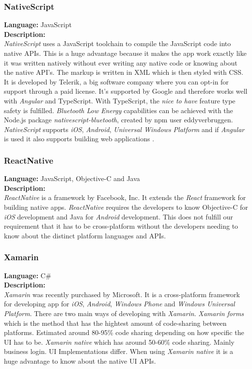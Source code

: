 \subsubsection{NativeScript}
\textbf{Language:} JavaScript
\\
\textbf{Description:}
\\
\textit{NativeScript} uses a JavaScript toolchain to compile the JavaScript code into native APIs. This is a huge advantage because it makes the app work exactly like it was written natively without ever writing any native code or knowing about the native API’s. The markup is written in XML which is then styled with CSS.
It is developed by Telerik, a big software company where you can opt-in for support through a paid license. It’s supported by Google and therefore works well with \textit{Angular} and TypeScript. With TypeScript, the \textit{nice to have} feature type safety is fulfilled. \textit{Bluetooth Low Energy} capabilities can be achieved with the Node.js package \textit{nativescript-bluetooth}, created by npm user eddyverbruggen. \textit{NativeScript} supports \textit{iOS}, \textit{Android}, \textit{Universal Windows Platform} and if \textit{Angular} is used it also supports building web applications \citep{preStudy:frameworks:nativescript}.


\subsubsection{ReactNative}
\textbf{Language:} JavaScript, Objective-C and Java
\\
\textbf{Description:}
\\
\textit{ReactNative} is a framework by Facebook, Inc. It extends the \textit{React} framework for building native apps. \textit{ReactNative} requires the developers to know Objective-C for \textit{iOS} development and Java for \textit{Android} development. This does not fulfill our requirement that it has to be cross-platform without the developers needing to know about the distinct platform languages and APIs.


\subsubsection{Xamarin}
\textbf{Language:} C\#
\\
\textbf{Description:}
\\ 
\textit{Xamarin} was recently purchased by Microsoft. It is a cross-platform framework for developing app for \textit{iOS}, \textit{Android}, \textit{Windows Phone} and \textit{Windows Universal Platform}. There are two main ways of developing with \textit{Xamarin}. \textit{Xamarin forms} which is the method that has the hightest amount of code-sharing between platforms. Estimated around 80-95\% code sharing depending on how specific the UI has to be. 
\textit{Xamarin native} which has around 50-60\% code sharing. Mainly business login. UI Implementations differ. When using \textit{Xamarin native} it is a huge advantage to know about the native UI APIs.

